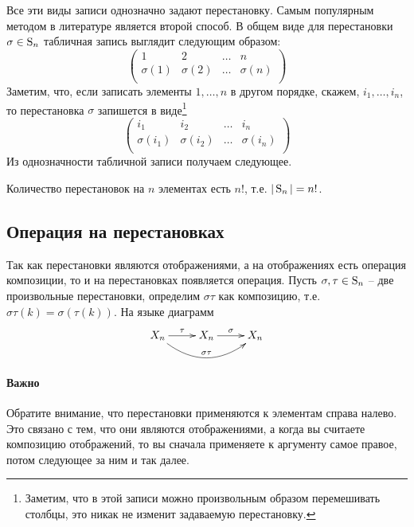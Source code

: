 Все эти виды записи однозначно задают перестановку. Самым популярным методом в литературе является второй способ. В общем виде для перестановки $\sigma\in\operatorname{S}_{n}$ табличная запись выглядит следующим образом:
\[
\begin{pmatrix}
{1}&{2}&{\ldots}&{n}\\
{\sigma(1)}&{\sigma(2)}&{\ldots}&{\sigma(n)}\\
\end{pmatrix}
\]
Заметим, что, если записать элементы $1,\ldots,n$ в другом порядке, скажем, $i_1,\ldots,i_n$, то перестановка $\sigma$ запишется в виде\footnote{Заметим, что в этой записи можно произвольным образом перемешивать столбцы, это никак не изменит задаваемую перестановку.}
\[
\begin{pmatrix}
{i_1}&{i_2}&{\ldots}&{i_n}\\
{\sigma(i_1)}&{\sigma(i_2)}&{\ldots}&{\sigma(i_n)}\\
\end{pmatrix}
\]
Из однозначности табличной записи получаем следующее.
\begin{claim*}
Количество перестановок на $n$ элементах есть $n!$, т.е. $|\operatorname{S}_{n}| = n!$.
\end{claim*}


\subsection{Операция на перестановках}

Так как перестановки являются отображениями, а на отображениях есть операция композиции, то и на перестановках появляется операция. Пусть $\sigma,\tau\in\operatorname{S}_{n}$ -- две произвольные перестановки, определим $\sigma \tau$ как композицию, т.е. $\sigma\tau(k) = \sigma(\tau(k))$. На языке диаграмм
\[
\xymatrix{
	{X_n}\ar[r]^{\tau}\ar@/_20pt/[rr]^{\sigma\tau}&{X_n}\ar[r]^{\sigma}&{X_n}
}
\]
\paragraph{Важно} Обратите внимание, что перестановки применяются к элементам справа налево. Это связано с тем, что они являются отображениями, а когда вы считаете композицию отображений, то вы сначала применяете к аргументу самое правое, потом следующее за ним и так далее.



